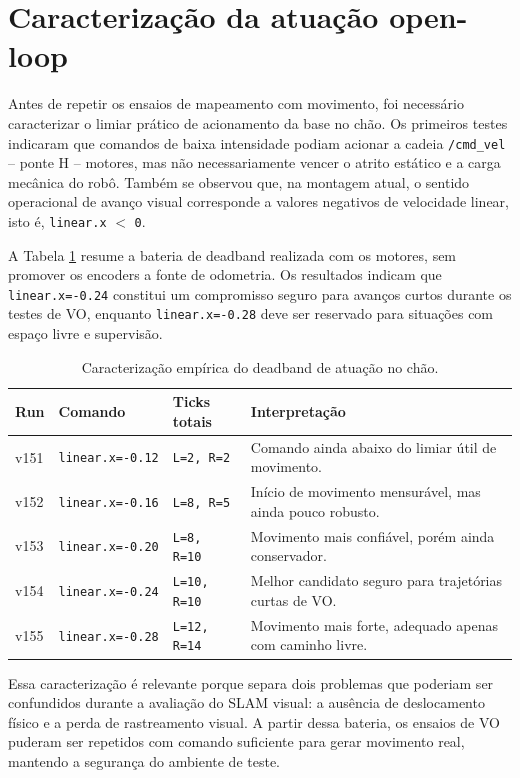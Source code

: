 \section{Caracterização da atuação open-loop}

Antes de repetir os ensaios de mapeamento com movimento, foi necessário caracterizar o limiar prático de acionamento da base no chão. Os primeiros testes indicaram que comandos de baixa intensidade podiam acionar a cadeia \texttt{/cmd\_vel} -- ponte H -- motores, mas não necessariamente vencer o atrito estático e a carga mecânica do robô. Também se observou que, na montagem atual, o sentido operacional de avanço visual corresponde a valores negativos de velocidade linear, isto é, \texttt{linear.x} $<$ \texttt{0}.

A Tabela \ref{tab:deadband-motores} resume a bateria de deadband realizada com os motores, sem promover os encoders a fonte de odometria. Os resultados indicam que \texttt{linear.x=-0.24} constitui um compromisso seguro para avanços curtos durante os testes de VO, enquanto \texttt{linear.x=-0.28} deve ser reservado para situações com espaço livre e supervisão.

\begin{table}[H]
\centering
\caption{Caracterização empírica do deadband de atuação no chão.}
\label{tab:deadband-motores}
\begin{tabularx}{\textwidth}{p{1.5cm} p{3.0cm} p{2.4cm} X}
\hline
\textbf{Run} & \textbf{Comando} & \textbf{Ticks totais} & \textbf{Interpretação} \\
\hline
v151 & \texttt{linear.x=-0.12} & \texttt{L=2, R=2} & Comando ainda abaixo do limiar útil de movimento. \\
v152 & \texttt{linear.x=-0.16} & \texttt{L=8, R=5} & Início de movimento mensurável, mas ainda pouco robusto. \\
v153 & \texttt{linear.x=-0.20} & \texttt{L=8, R=10} & Movimento mais confiável, porém ainda conservador. \\
v154 & \texttt{linear.x=-0.24} & \texttt{L=10, R=10} & Melhor candidato seguro para trajetórias curtas de VO. \\
v155 & \texttt{linear.x=-0.28} & \texttt{L=12, R=14} & Movimento mais forte, adequado apenas com caminho livre. \\
\hline
\end{tabularx}
\end{table}

Essa caracterização é relevante porque separa dois problemas que poderiam ser confundidos durante a avaliação do SLAM visual: a ausência de deslocamento físico e a perda de rastreamento visual. A partir dessa bateria, os ensaios de VO puderam ser repetidos com comando suficiente para gerar movimento real, mantendo a segurança do ambiente de teste.

